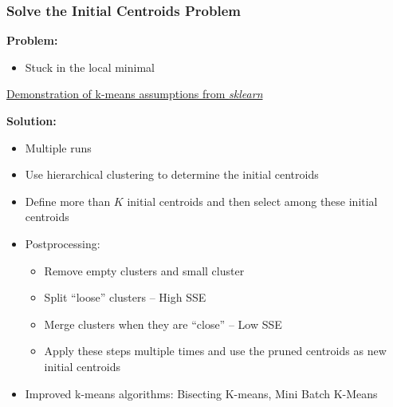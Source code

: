 \documentclass[aspectratio=169, 10pt]{beamer}
\begin{document}
\begin{frame}
    \frametitle{Solve the Initial Centroids Problem}
    
    \textbf{Problem:} 
    \begin{itemize}
        \item Stuck in the local minimal 
    \end{itemize}

    \begin{example}
        \href{https://scikit-learn.org/stable/auto\_examples/cluster/plot\_kmeans\_assumptions.html}{Demonstration of k-means assumptions from \textit{sklearn}}
    \end{example}

    \textbf{Solution:}
    \begin{itemize}
        \item Multiple runs
        \item Use hierarchical clustering to determine the initial centroids
        \item Define more than $K$ initial centroids and then select among these initial centroids
        \item Postprocessing:
            \begin{itemize}
                \item Remove empty clusters and small cluster
                \item Split ``loose'' clusters -- High SSE
                \item Merge clusters when they are ``close'' -- Low SSE
                \item Apply these steps multiple times and use the pruned centroids as new initial centroids
            \end{itemize}
        \item Improved k-means algorithms: Bisecting K-means, Mini Batch K-Means
    \end{itemize}
 
\end{frame}
\end{document}
